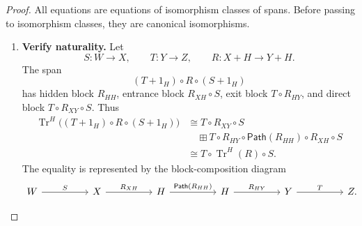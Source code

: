 \begin{proof}
All equations are equations of isomorphism classes of spans. Before passing
to isomorphism classes, they are canonical isomorphisms.

\begin{enumerate}
  \item \textbf{Verify naturality.}
  Let
  \[
    S:W\to X,
    \qquad
    T:Y\to Z,
    \qquad
    R:X+H\to Y+H.
  \]
  The span
  \[
    (T+1_H)\circ R\circ(S+1_H)
  \]
  has hidden block \(R_{HH}\), entrance block \(R_{XH}\circ S\), exit block
  \(T\circ R_{HY}\), and direct block \(T\circ R_{XY}\circ S\). Thus
  \[
  \begin{aligned}
    \operatorname{Tr}^{H}
    \bigl((T+1_H)\circ R\circ(S+1_H)\bigr)
    &\cong
    T\circ R_{XY}\circ S
    \\
    &\quad\boxplus
    T\circ R_{HY}\circ\mathsf{Path}(R_{HH})
    \circ R_{XH}\circ S
    \\
    &\cong
    T\circ\operatorname{Tr}^{H}(R)\circ S.
  \end{aligned}
  \]
  The equality is represented by the block-composition diagram
  \[
  \begin{tikzcd}[column sep=huge,row sep=large]
    W
      \ar[r,"S"]
    &
    X
      \ar[r,"R_{XH}"]
    &
    H
      \ar[r,"\mathsf{Path}(R_{HH})"]
    &
    H
      \ar[r,"R_{HY}"]
    &
    Y
      \ar[r,"T"]
    &
    Z .
  \end{tikzcd}
  \]


\end{enumerate}
\end{proof}
